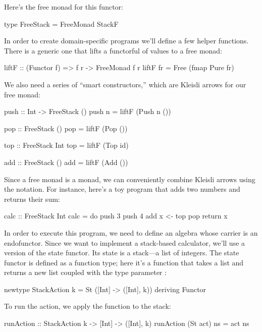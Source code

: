 \documentclass[DaoFP]{subfiles}
\begin{document}
Here's the free monad for this functor:
\begin{haskell}
type FreeStack = FreeMonad StackF
\end{haskell}

In order to create domain-specific programs we'll define a few helper functions. There is a generic one that lifts a functorful of values to a free monad:
\begin{haskell} 
liftF :: (Functor f) => f r -> FreeMonad f r
liftF fr = Free (fmap Pure fr)
\end{haskell}
We also need a series of ``smart constructors,'' which are Kleisli arrows for our free monad:
\begin{haskell}
push :: Int -> FreeStack ()
push n = liftF (Push n ())

pop :: FreeStack ()
pop = liftF (Pop ())

top :: FreeStack Int
top = liftF (Top id)

add :: FreeStack ()
add = liftF (Add ())
\end{haskell}

Since a free monad is a monad, we can conveniently combine Kleisli arrows using the  notation. For instance, here's a toy program that adds two numbers and returns their sum:
\begin{haskell}
calc :: FreeStack Int
calc = do
  push 3
  push 4
  add
  x <- top
  pop
  return x
\end{haskell}

In order to execute this program, we need to define an algebra whose carrier is an endofunctor. Since we want to implement a stack-based calculator, we'll use a version of the state functor. Its state is a stack---a list of integers. The state functor is defined as a function type; here it's a function that takes a list and returns a new list coupled with the type parameter :
\begin{haskell}
newtype StackAction k = St ([Int] -> ([Int], k))
  deriving Functor
\end{haskell}

To run the action, we apply the function to the stack:
\begin{haskell}
runAction :: StackAction k -> [Int] -> ([Int], k)
runAction (St act) ns = act ns
\end{haskell}
\end{document}
